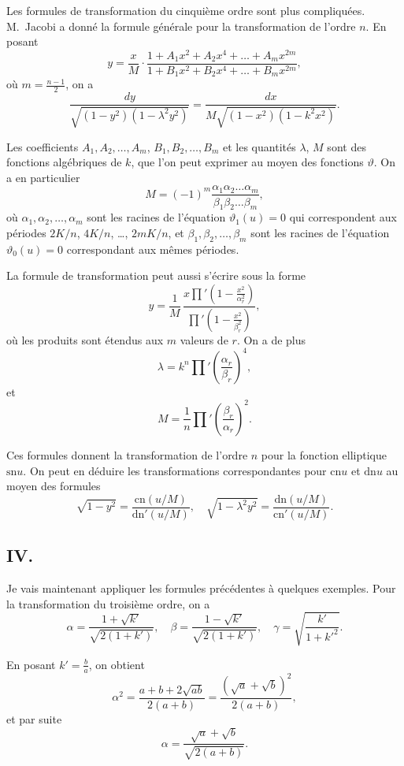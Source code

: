 \documentclass[11pt,a4paper]{book}
\providecommand{\sn}{\mathrm{sn}}
\providecommand{\cn}{\mathrm{cn}}
\providecommand{\dn}{\mathrm{dn}}
\begin{document}
\setcounter{page}{67}

Les formules de transformation du cinquième ordre sont plus compliquées. M.~Jacobi a donné la formule générale pour la transformation de l'ordre $n$. En posant
\[
y = \frac{x}{M} \cdot \frac{1+A_1x^2+A_2x^4+\ldots+A_mx^{2m}}{1+B_1x^2+B_2x^4+\ldots+B_mx^{2m}},
\]
où $m = \frac{n-1}{2}$, on a
\[
\frac{dy}{\sqrt{(1-y^2)(1-\lambda^2y^2)}}
= \frac{dx}{M\sqrt{(1-x^2)(1-k^2x^2)}}.
\]

Les coefficients $A_1,A_2,\ldots,A_m$, $B_1,B_2,\ldots,B_m$ et les quantités $\lambda$, $M$ sont des fonctions algébriques de $k$, que l'on peut exprimer au moyen des fonctions $\vartheta$. On a en particulier
\[
M = (-1)^m \frac{\alpha_1\alpha_2\ldots\alpha_m}{\beta_1\beta_2\ldots\beta_m},
\]
où $\alpha_1,\alpha_2,\ldots,\alpha_m$ sont les racines de l'équation $\vartheta_1(u)=0$ qui correspondent aux périodes $2K/n$, $4K/n$, \ldots, $2mK/n$, et $\beta_1,\beta_2,\ldots,\beta_m$ sont les racines de l'équation $\vartheta_0(u)=0$ correspondant aux mêmes périodes.

\setcounter{page}{68}

La formule de transformation peut aussi s'écrire sous la forme
\[
y = \frac{1}{M}\, \frac{x\prod'(1-\frac{x^2}{\alpha_r^2})}{\prod'(1-\frac{x^2}{\beta_r^2})},
\]
où les produits sont étendus aux $m$ valeurs de $r$. On a de plus
\[
\lambda = k^n \prod' \left(\frac{\alpha_r}{\beta_r}\right)^4,
\]
et
\[
M = \frac{1}{n} \prod' \left(\frac{\beta_r}{\alpha_r}\right)^2.
\]

Ces formules donnent la transformation de l'ordre $n$ pour la fonction elliptique $\sn u$. On peut en déduire les transformations correspondantes pour $\cn u$ et $\dn u$ au moyen des formules
\[
\sqrt{1-y^2} = \frac{\cn(u/M)}{\dn'(u/M)}, \quad \sqrt{1-\lambda^2y^2} = \frac{\dn(u/M)}{\cn'(u/M)}.
\]

\setcounter{page}{69}

\subsection*{IV.}

Je vais maintenant appliquer les formules précédentes à quelques exemples. Pour la transformation du troisième ordre, on a
\[
\alpha = \frac{1+\sqrt{k'}}{\sqrt{2(1+k')}}, \quad
\beta = \frac{1-\sqrt{k'}}{\sqrt{2(1+k')}}, \quad
\gamma = \sqrt{\frac{k'}{1+k'^2}}.
\]

En posant $k' = \frac{b}{a}$, on obtient
\[
\alpha^2 = \frac{a+b+2\sqrt{ab}}{2(a+b)} = \frac{(\sqrt{a}+\sqrt{b})^2}{2(a+b)},
\]
et par suite
\[
\alpha = \frac{\sqrt{a}+\sqrt{b}}{\sqrt{2(a+b)}}.
\]
\end{document}
